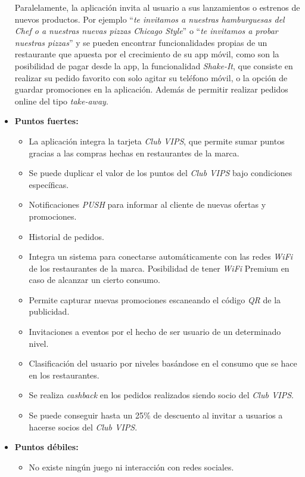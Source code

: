 \documentclass[twoside]{report}
\begin{document}
\begin{itemize}
Paralelamente, la aplicación invita al usuario a sus lanzamientos o estrenos de nuevos productos. Por ejemplo “\textit{te invitamos a nuestras hamburguesas del Chef o a nuestras nuevas pizzas Chicago Style}” o “\textit{te invitamos a probar nuestras pizzas}” y se pueden encontrar funcionalidades propias de un restaurante que apuesta por el crecimiento de su app móvil, como son la posibilidad de pagar desde la app, la funcionalidad \textit{Shake-It}, que consiste en realizar su pedido favorito con solo agitar su teléfono móvil, o la opción de guardar promociones en la aplicación. Además de permitir realizar pedidos online del tipo \textit{take-away}.
\item \textbf{Puntos fuertes:}
	\begin{itemize}
	\item La aplicación integra la tarjeta \textit{Club VIPS}, que permite sumar puntos gracias a las compras hechas en restaurantes de la marca.
	\item Se puede duplicar el valor de los puntos del  \textit{Club VIPS} bajo condiciones específicas.
	\item Notificaciones \textit{PUSH} para informar al cliente de nuevas ofertas y promociones.
	\item Historial de pedidos.
	\item Integra un sistema para conectarse automáticamente con las redes \textit{WiFi} de los restaurantes de la marca. Posibilidad de tener \textit{WiFi} Premium en caso de alcanzar un cierto consumo.
	\item Permite capturar nuevas promociones escaneando el código \textit{QR} de la publicidad.
	\item Invitaciones a eventos por el hecho de ser usuario de un determinado nivel.
	\item Clasificación del usuario por niveles basándose en el consumo que se hace en los restaurantes.
	\item Se realiza \textit{cashback} en los pedidos realizados siendo socio del \textit{Club VIPS}.
	\item Se puede conseguir hasta un 25\% de descuento al invitar a usuarios a hacerse socios del \textit{Club VIPS}.
	\end{itemize}
\item \textbf{Puntos débiles:}
	\begin{itemize}
	\item No existe ningún juego ni interacción con redes sociales.
	\end{itemize}
\end{itemize}
\end{document}
